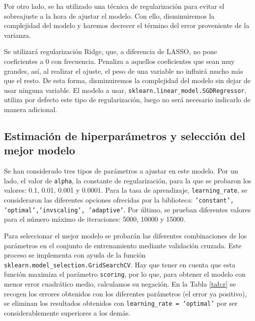 \documentclass[a4paper, 20pt]{article}
\begin{document}
{Por otro lado, se ha utilizado una técnica de regularización para evitar el sobreajuste a la hora de ajustar el modelo. Con ello, disminuiremos la complejidad del modelo y haremos decrecer el término del error proveniente de la varianza.

Se utilizará regularización Ridge, que, a diferencia de LASSO, no pone coeficientes a 0 con frecuencia. Penaliza a aquellos coeficientes que sean muy grandes, así, al realizar el ajuste, el peso de una variable no influirá mucho más que el resto. De esta forma, disminuiremos la complejidad del modelo sin dejar de usar ninguna variable. El modelo a usar, \texttt{sklearn.linear\_model.SGDRegressor}, utiliza por defecto este tipo de regularización, luego no será necesario indicarlo de manera adicional.


\subsection{Estimación de hiperparámetros y selección del mejor modelo}\label{sec:hp}
Se han considerado tres tipos de parámetros a ajustar en este modelo. Por un lado, el valor de \texttt{alpha}, la constante de regularización, para la que se probaron los valores: 0.1, 0.01, 0.001 y 0.0001. Para la tasa de aprendizaje, \texttt{learning\_rate}, se consideraron las diferentes opciones ofrecidas por la biblioteca: \texttt{'constant', 'optimal','invscaling', 'adaptive'}. Por último, se prueban diferentes valores para el número máximo de iteraciones: 5000, 10000 y 15000.

Para seleccionar el mejor modelo se probarán las diferentes combinaciones de los parámetros en el conjunto de entrenamiento mediante validación cruzada. Este proceso se implementa con ayuda de la función \texttt{sklearn.model\_selection.GridSearchCV}. Hay que tener en cuenta que esta función maximiza el parámetro \texttt{scoring}, por lo que, para obtener el modelo con menor error cuadrático medio, calculamos su negación. En la Tabla \ref{tab:r} se recogen los errores obtenidos con los diferentes parámetros (el error ya positivo), se eliminan los resultados obtenidos con \texttt{learning\_rate = 'optimal'} por ser considerablemente superiores a los demás.

}
\end{document}
